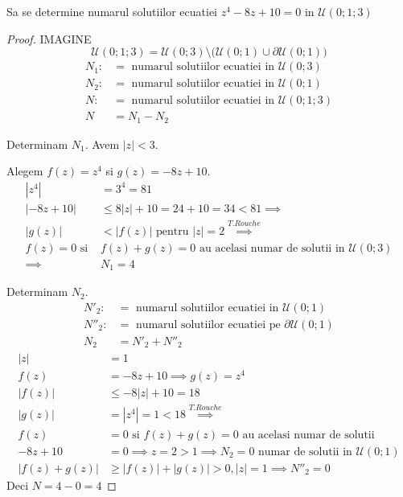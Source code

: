 \begin{aplicatie}
    Sa se determine numarul solutiilor ecuatiei $z^4 -8z + 10 = 0 $ in $\mathcal{U}(0;1;3)$
    \begin{proof}
        IMAGINE
        \[
            \mathcal{U}(0;1;3) = \mathcal{U}(0;3)\setminus
                \big(\mathcal{U}(0;1) \cup \partial \mathcal{U}(0;1)\big)
        \]
        \begin{align*}
            N_1 :&= \text{ numarul solutiilor ecuatiei in } \mathcal{U}(0;3) \\
            N_2 :&= \text{ numarul solutiilor ecuatiei in } \mathcal{U}(0;1) \\
            N :&= \text{ numarul solutiilor ecuatiei in } \mathcal{U}(0;1;3)  \\
            N &= N_1 - N_2
        \end{align*}

        Determinam $N_1$. Avem $|z| < 3$.

        Alegem $f(z) = z^4$ si $g(z) = -8z + 10$.
        \begin{align*}
            |z^4| &= 3^4 = 81 \\
            |-8z + 10| &\leq 8|z| + 10 = 24 + 10 = 34 < 81 \implies \\
            |g(z)| &< |f(z)| \text{ pentru } |z| = 2 \overset{T.Rouche}{\implies} \\
            f(z) = 0 \text{ si } & f(z) + g(z) = 0 \text{ au acelasi numar de solutii in }
                \mathcal{U}(0;3) \\
            \implies & N_1 = 4
        \end{align*}

        Determinam $N_2$.
        \begin{align*}
            N'_2 :&= \text{ numarul solutiilor ecuatiei in } \mathcal{U}(0;1) \\
            N''_2 :&= \text{ numarul solutiilor ecuatiei pe } \partial \mathcal{U}(0;1) \\
            N_2 &= N'_2 + N''_2
        \end{align*}
        \begin{align*}
            |z| & = 1 \\
            f(z) & = -8z + 10 \implies g(z) = z^4 \\
            |f(z)| &\leq -8|z| + 10 =  18 \\
            |g(z)| &= |z^4| = 1 < 18 \overset{T.Rouche}{\implies}\\
            f(z) &= 0 \text{ si } f(z) + g(z) = 0 \text{ au acelasi numar de solutii }\\
            -8z + 10 &= 0 \implies z = 2 > 1 \implies N_2 = 0 \text{ numar de solutii in } \mathcal{U}(0;1)\\
            |f(z) + g(z)| &\geq |f(z)| + |g(z)| > 0, |z| = 1 \implies N''_2 = 0
        \end{align*}
        Deci $N = 4-0 = 4$
    \end{proof}
\end{aplicatie}


